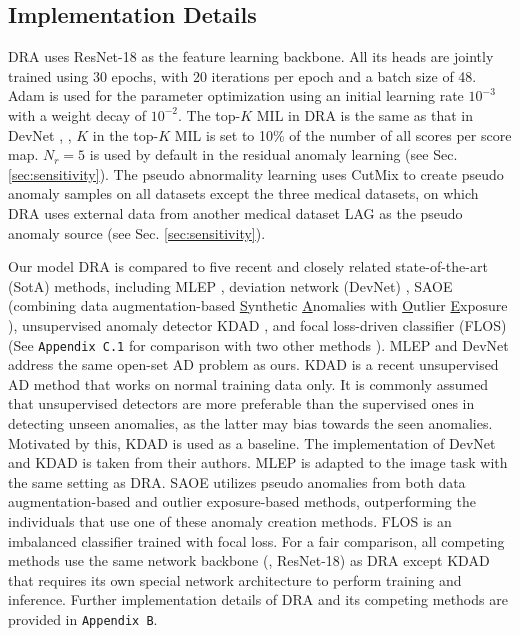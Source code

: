 \documentclass[10pt,twocolumn,letterpaper]{article}
\begin{document}
\subsection{Implementation Details}\label{sec:implementation}


DRA uses ResNet-18 as the feature learning backbone. 
All its heads are jointly trained using 30 epochs, with 20 iterations per epoch and a batch size of 48. Adam is used for the parameter optimization using an initial learning rate $10^{-3}$ with a weight decay of $10^{-2}$. The top-$K$ MIL in DRA is the same as that in DevNet \cite{pang2021explainable}, \ie, $K$ in the top-$K$ MIL is set to 10\% of the number of all scores per score map. $\mathit{N}_{r}=5$ is used by default in the residual anomaly learning (see Sec. \ref{sec:sensitivity}).
The pseudo abnormality learning uses CutMix \cite{yun2019cutmix} to create pseudo anomaly samples on all datasets except the three medical datasets, on which DRA uses external data from another medical dataset LAG \cite{Li_2019_CVPR} as the pseudo anomaly source (see Sec. \ref{sec:sensitivity}). 

Our model DRA is compared to five recent and closely related state-of-the-art (SotA) methods, including MLEP \cite{liu2019margin}, deviation network (DevNet) \cite{pang2021explainable,pang2019deep}, SAOE (combining data augmentation-based \underline{S}ynthetic \underline{A}nomalies \cite{li2021cutpaste, liznerski2021explainable,tack2020csi} with \underline{O}utlier \underline{E}xposure \cite{hendrycks2018deep, reiss2021panda}), unsupervised anomaly detector KDAD \cite{salehi2021multiresolution}, and focal loss-driven classifier (FLOS) \cite{lin2017focalloss} (See \texttt{Appendix C.1} for comparison with two other methods \cite{ruff2019deep,wang2018revisiting}). 
MLEP and DevNet address the same open-set AD problem as ours. KDAD is a recent unsupervised AD method that works on normal training data only. It is commonly assumed that unsupervised detectors are more preferable than the supervised ones in detecting unseen anomalies, as the latter may bias towards the seen anomalies. Motivated by this, KDAD is used as a baseline. The implementation of DevNet and KDAD is taken from their authors. MLEP is adapted to the image task with the same setting as DRA. SAOE utilizes pseudo anomalies from both data augmentation-based and outlier exposure-based methods, outperforming the individuals that use one of these anomaly creation methods.
FLOS is an imbalanced classifier trained with focal loss. 
For a fair comparison, all competing methods use the same network backbone (\ie, ResNet-18) as DRA except KDAD that requires its own special network architecture to perform training and inference. Further implementation details of DRA and its competing methods are provided in \texttt{Appendix B}.
\end{document}
